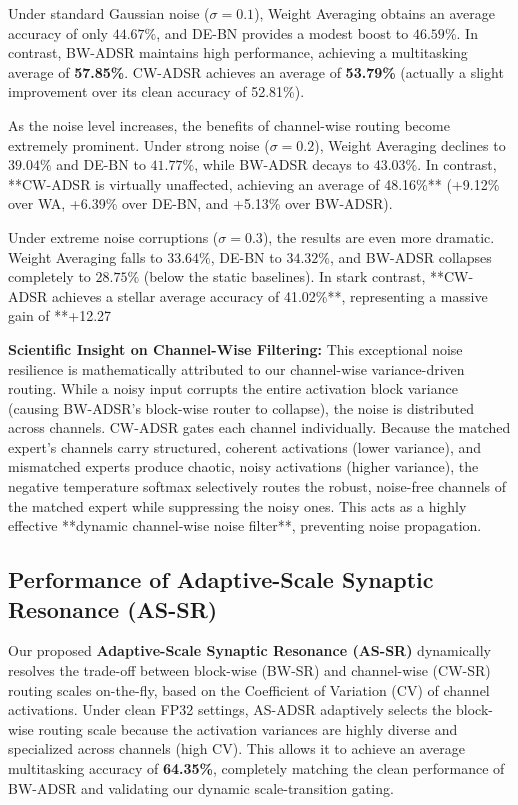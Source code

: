 \documentclass{article}
\theoremstyle{plain}
\theoremstyle{definition}
\theoremstyle{remark}
\begin{document}
Under standard Gaussian noise ($\sigma = 0.1$), Weight Averaging obtains an average accuracy of only $44.67\%$, and DE-BN provides a modest boost to $46.59\%$. In contrast, BW-ADSR maintains high performance, achieving a multitasking average of \textbf{57.85\%}. CW-ADSR achieves an average of \textbf{53.79\%} (actually a slight improvement over its clean accuracy of 52.81\%).

As the noise level increases, the benefits of channel-wise routing become extremely prominent. Under strong noise ($\sigma = 0.2$), Weight Averaging declines to $39.04\%$ and DE-BN to $41.77\%$, while BW-ADSR decays to $43.03\%$. In contrast, **CW-ADSR is virtually unaffected, achieving an average of 48.16\%** (+9.12\% over WA, +6.39\% over DE-BN, and +5.13\% over BW-ADSR).

Under extreme noise corruptions ($\sigma = 0.3$), the results are even more dramatic. Weight Averaging falls to $33.64\%$, DE-BN to $34.32\%$, and BW-ADSR collapses completely to $28.75\%$ (below the static baselines). In stark contrast, **CW-ADSR achieves a stellar average accuracy of 41.02\%**, representing a massive gain of **+12.27%

\textbf{Scientific Insight on Channel-Wise Filtering:} This exceptional noise resilience is mathematically attributed to our channel-wise variance-driven routing. While a noisy input corrupts the entire activation block variance (causing BW-ADSR's block-wise router to collapse), the noise is distributed across channels. CW-ADSR gates each channel individually. Because the matched expert's channels carry structured, coherent activations (lower variance), and mismatched experts produce chaotic, noisy activations (higher variance), the negative temperature softmax selectively routes the robust, noise-free channels of the matched expert while suppressing the noisy ones. This acts as a highly effective **dynamic channel-wise noise filter**, preventing noise propagation.

\subsection{Performance of Adaptive-Scale Synaptic Resonance (AS-SR)}
Our proposed \textbf{Adaptive-Scale Synaptic Resonance (AS-SR)} dynamically resolves the trade-off between block-wise (BW-SR) and channel-wise (CW-SR) routing scales on-the-fly, based on the Coefficient of Variation (CV) of channel activations. Under clean FP32 settings, AS-ADSR adaptively selects the block-wise routing scale because the activation variances are highly diverse and specialized across channels (high CV). This allows it to achieve an average multitasking accuracy of \textbf{64.35\%}, completely matching the clean performance of BW-ADSR and validating our dynamic scale-transition gating.
\end{document}

